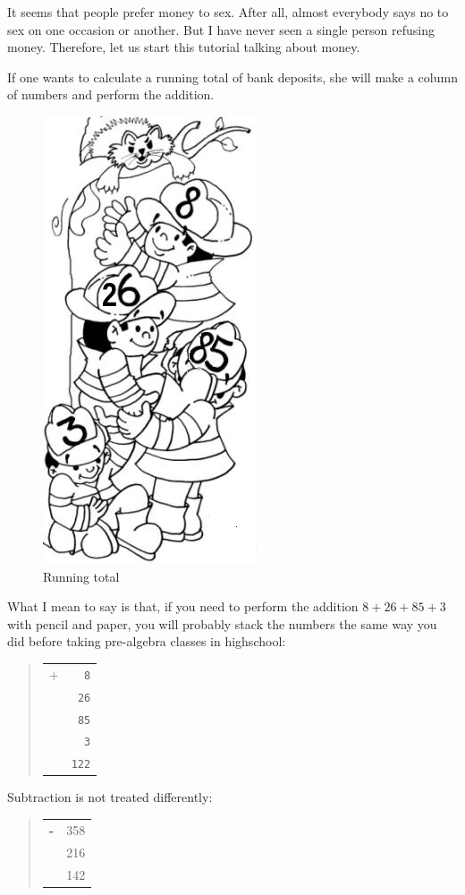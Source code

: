\documentclass[a4paper,12pt]{book}
\begin{document}
It seems that people prefer money to sex.
After all, almost everybody says no to
sex on one occasion or another.
But I have never seen a single
person refusing money. Therefore, let us
start this tutorial talking about money.

If one wants to calculate a running
total of bank deposits, she will make
a column of numbers and perform the
addition.

\begin{figure}
\renewcommand\figurename{Fig.}
\includegraphics[scale=0.5]{figs-prefix/firemen.png}
\caption{Running total}
\end{figure}
What I mean to say is that, if you
need to perform the addition
$8 + 26 + 85 + 3$ with pencil and paper,
you will probably stack the numbers the
same way you did before taking pre-algebra
classes in highschool:
\begin{quote}
\begin{tabular}{p{0.5cm}p{1cm}}
+ &\verb|  8|\\
&\verb| 26|\\
&\verb| 85|\\
&\verb|  3|\\
\hline
&\verb|122|
\end{tabular}
\end{quote}
Subtraction is not treated differently:
\begin{quote}
\begin{tabular}{p{0.5cm}p{1.5cm}}
\Large\bf -&   358\\
&   216\\
\hline
& 142
\end{tabular}
\end{quote}
\end{document}
